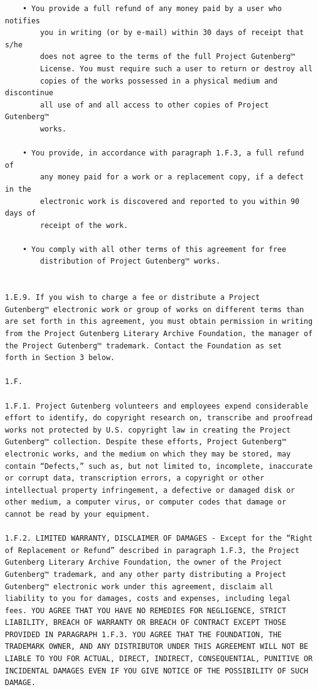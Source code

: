 \documentclass{article}
\begin{document}
\begin{verbatim}
    • You provide a full refund of any money paid by a user who notifies
        you in writing (or by e-mail) within 30 days of receipt that s/he
        does not agree to the terms of the full Project Gutenberg™
        License. You must require such a user to return or destroy all
        copies of the works possessed in a physical medium and discontinue
        all use of and all access to other copies of Project Gutenberg™
        works.

    • You provide, in accordance with paragraph 1.F.3, a full refund of
        any money paid for a work or a replacement copy, if a defect in the
        electronic work is discovered and reported to you within 90 days of
        receipt of the work.

    • You comply with all other terms of this agreement for free
        distribution of Project Gutenberg™ works.


1.E.9. If you wish to charge a fee or distribute a Project
Gutenberg™ electronic work or group of works on different terms than
are set forth in this agreement, you must obtain permission in writing
from the Project Gutenberg Literary Archive Foundation, the manager of
the Project Gutenberg™ trademark. Contact the Foundation as set
forth in Section 3 below.

1.F.

1.F.1. Project Gutenberg volunteers and employees expend considerable
effort to identify, do copyright research on, transcribe and proofread
works not protected by U.S. copyright law in creating the Project
Gutenberg™ collection. Despite these efforts, Project Gutenberg™
electronic works, and the medium on which they may be stored, may
contain “Defects,” such as, but not limited to, incomplete, inaccurate
or corrupt data, transcription errors, a copyright or other
intellectual property infringement, a defective or damaged disk or
other medium, a computer virus, or computer codes that damage or
cannot be read by your equipment.

1.F.2. LIMITED WARRANTY, DISCLAIMER OF DAMAGES - Except for the “Right
of Replacement or Refund” described in paragraph 1.F.3, the Project
Gutenberg Literary Archive Foundation, the owner of the Project
Gutenberg™ trademark, and any other party distributing a Project
Gutenberg™ electronic work under this agreement, disclaim all
liability to you for damages, costs and expenses, including legal
fees. YOU AGREE THAT YOU HAVE NO REMEDIES FOR NEGLIGENCE, STRICT
LIABILITY, BREACH OF WARRANTY OR BREACH OF CONTRACT EXCEPT THOSE
PROVIDED IN PARAGRAPH 1.F.3. YOU AGREE THAT THE FOUNDATION, THE
TRADEMARK OWNER, AND ANY DISTRIBUTOR UNDER THIS AGREEMENT WILL NOT BE
LIABLE TO YOU FOR ACTUAL, DIRECT, INDIRECT, CONSEQUENTIAL, PUNITIVE OR
INCIDENTAL DAMAGES EVEN IF YOU GIVE NOTICE OF THE POSSIBILITY OF SUCH
DAMAGE.


\end{verbatim}
\end{document}
